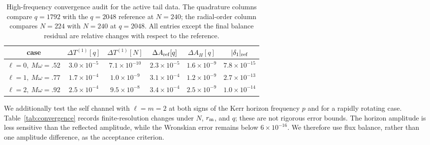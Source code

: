 \documentclass[aps,prd,twocolumn,10pt,nofootinbib,superscriptaddress,floatfix]{revtex4-2}
\begin{document}
\begin{table}[t]
\caption{High-frequency convergence audit for the active tail data.  The
quadrature columns compare $q=1792$ with the $q=2048$ reference at $N=240$;
the radial-order column compares $N=224$ with $N=240$ at $q=2048$.  All
entries except the final balance residual are relative changes with respect to
the reference.}
\label{tab:tail-convergence}
\begin{ruledtabular}
\begin{tabular}{c c c c c c}
case & $\Delta T^{(1)}[q]$ & $\Delta T^{(1)}[N]$
& $\Delta A_{\rm ref}[q]$ & $\Delta A_H[q]$ & $|\delta_1|_{\rm ref}$\\
\hline
$\ell=0,\ M\omega=.52$ & $3.0\times10^{-5}$ & $7.1\times10^{-10}$ & $2.3\times10^{-5}$ & $1.6\times10^{-9}$ & $7.8\times10^{-15}$\\
$\ell=1,\ M\omega=.77$ & $1.7\times10^{-4}$ & $1.0\times10^{-9}$ & $3.1\times10^{-4}$ & $1.2\times10^{-9}$ & $2.7\times10^{-13}$\\
$\ell=2,\ M\omega=.92$ & $2.5\times10^{-4}$ & $9.5\times10^{-8}$ & $3.4\times10^{-4}$ & $2.5\times10^{-9}$ & $1.0\times10^{-14}$\\
\end{tabular}
\end{ruledtabular}
\end{table}

We additionally test the self channel with $\ell=m=2$ at both signs of the
Kerr horizon frequency $p$ and for a rapidly rotating case.  Table~\ref{tab:convergence}
records finite-resolution changes under $N$, $r_{\rm m}$, and $q$; these are
not rigorous error bounds.  The horizon amplitude is less sensitive than the
reflected amplitude, while the Wronskian error remains below
$6\times10^{-16}$.  We therefore use flux balance, rather than one amplitude
difference, as the acceptance criterion.
\end{document}
